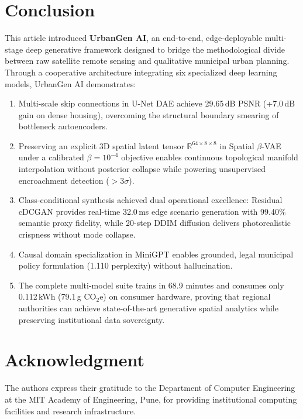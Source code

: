 \documentclass[journal]{IEEEtran}
\begin{document}
\section{Conclusion}
This article introduced \textbf{UrbanGen AI}, an end-to-end, edge-deployable multi-stage deep generative framework designed to bridge the methodological divide between raw satellite remote sensing and qualitative municipal urban planning. Through a cooperative architecture integrating six specialized deep learning models, UrbanGen AI demonstrates:
\begin{enumerate}
    \item Multi-scale skip connections in U-Net DAE achieve 29.65\,dB PSNR (+7.0\,dB gain on dense housing), overcoming the structural boundary smearing of bottleneck autoencoders.
    \item Preserving an explicit 3D spatial latent tensor $\mathbb{R}^{64 \times 8 \times 8}$ in Spatial $\beta$-VAE under a calibrated $\beta = 10^{-4}$ objective enables continuous topological manifold interpolation without posterior collapse while powering unsupervised encroachment detection ($>3\sigma$).
    \item Class-conditional synthesis achieved dual operational excellence: Residual cDCGAN provides real-time 32.0\,ms edge scenario generation with 99.40\% semantic proxy fidelity, while 20-step DDIM diffusion delivers photorealistic crispness without mode collapse.
    \item Causal domain specialization in MiniGPT enables grounded, legal municipal policy formulation (1.110 perplexity) without hallucination.
    \item The complete multi-model suite trains in 68.9 minutes and consumes only 0.112\,kWh (79.1\,g CO$_2$e) on consumer hardware, proving that regional authorities can achieve state-of-the-art generative spatial analytics while preserving institutional data sovereignty.
\end{enumerate}

\section*{Acknowledgment}
The authors express their gratitude to the Department of Computer Engineering at the MIT Academy of Engineering, Pune, for providing institutional computing facilities and research infrastructure.
\end{document}

